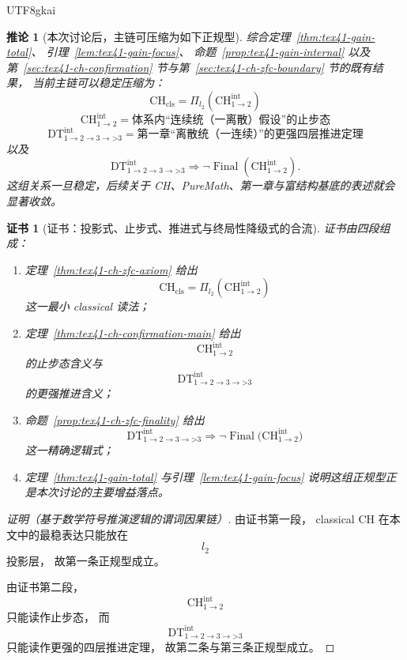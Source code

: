 \documentclass[12pt]{article}
\newtheorem{corollary}{推论}[section]
\newtheorem{Certificate}{证书}[section]
\newcommand{\ProjLtwo}{\Pi_{l_2}}
\newcommand{\Final}{\operatorname{Final}}
\begin{document}
\begin{CJK*}{UTF8}{gkai}
\begin{corollary}[本次讨论后，主链可压缩为如下正规型]
\label{cor:tex41-gain-position}
综合定理~\ref{thm:tex41-gain-total}、
引理~\ref{lem:tex41-gain-focus}、
命题~\ref{prop:tex41-gain-internal}
以及第~\ref{sec:tex41-ch-confirmation} 节与第~\ref{sec:tex41-ch-zfc-boundary} 节的既有结果，
当前主链可以稳定压缩为：
\[
\boxed{
  \mathrm{CH}_{\mathrm{cls}}
  =
  \ProjLtwo\!\left(\mathrm{CH}^{\mathrm{int}}_{1\to2}\right)
}
\]
\[
\boxed{
  \mathrm{CH}^{\mathrm{int}}_{1\to2}
  =
  \text{体系内“连续统（一离散）假设”的止步态}
}
\]
\[
\boxed{
  \mathrm{DT}^{\mathrm{int}}_{1\to2\to3\to\text{>3}}
  =
  \text{第一章“离散统（一连续）”的更强四层推进定理}
}
\]
以及
\[
\boxed{
  \mathrm{DT}^{\mathrm{int}}_{1\to2\to3\to\text{>3}}
  \Rightarrow
  \neg \Final\!\left(\mathrm{CH}^{\mathrm{int}}_{1\to2}\right)
}.
\]
这组关系一旦稳定，后续关于 CH、PureMath、第一章与富结构基底的表述就会显著收敛。
\end{corollary}

\begin{Certificate}[证书：投影式、止步式、推进式与终局性降级式的合流]
\label{cert:tex41-gain-position}
证书由四段组成：
\begin{enumerate}
  \item 定理~\ref{thm:tex41-ch-zfc-axiom} 给出
  \[
    \mathrm{CH}_{\mathrm{cls}}
    =
    \ProjLtwo\!\left(\mathrm{CH}^{\mathrm{int}}_{1\to2}\right)
  \]
  这一最小 classical 读法；
  \item 定理~\ref{thm:tex41-ch-confirmation-main} 给出
  \[
    \mathrm{CH}^{\mathrm{int}}_{1\to2}
  \]
  的止步态含义与
  \[
    \mathrm{DT}^{\mathrm{int}}_{1\to2\to3\to\text{>3}}
  \]
  的更强推进含义；
  \item 命题~\ref{prop:tex41-ch-zfc-finality} 给出
  \[
    \mathrm{DT}^{\mathrm{int}}_{1\to2\to3\to\text{>3}}
    \Rightarrow
    \neg \Final\!\bigl(\mathrm{CH}^{\mathrm{int}}_{1\to2}\bigr)
  \]
  这一精确逻辑式；
  \item 定理~\ref{thm:tex41-gain-total} 与引理~\ref{lem:tex41-gain-focus} 说明这组正规型正是本次讨论的主要增益落点。
\end{enumerate}
\end{Certificate}

\begin{proof}[证明（基于数学符号推演逻辑的谓词因果链）]
由证书第一段，
classical CH 在本文中的最稳表达只能放在
\[
  l_2
\]
投影层，
故第一条正规型成立。

由证书第二段，
\[
  \mathrm{CH}^{\mathrm{int}}_{1\to2}
\]
只能读作止步态，
而
\[
  \mathrm{DT}^{\mathrm{int}}_{1\to2\to3\to\text{>3}}
\]
只能读作更强的四层推进定理，
故第二条与第三条正规型成立。


\end{proof}
\end{CJK*}
\end{document}
